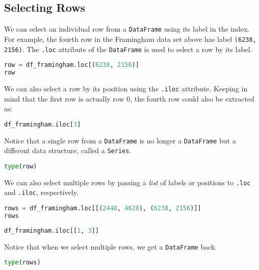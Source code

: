 \subsection{Selecting Rows}\label{1.2.1}

We can select an individual row from a \verb|DataFrame| using its label in the index. For example, the fourth row in the Framingham data set above has label \verb|(6238, 2156)|. The \verb|.loc| attribute of the \verb|DataFrame| is used to select a row by its label.

\begin{lstlisting}[language=Python]
row = df_framingham.loc[(6238, 2156)]
row
\end{lstlisting}




We can also select a row by its position using the \verb|.iloc| attribute. Keeping in mind that the first row is actually row 0, the fourth row could also be extracted as:

\begin{lstlisting}[language=Python]
df_framingham.iloc[3]
\end{lstlisting}




Notice that a single row from a \verb|DataFrame| is no longer a \verb|DataFrame| but a different data structure, called a \verb|Series|.

\begin{lstlisting}[language=Python]
type(row)
\end{lstlisting}




We can also select multiple rows by passing a \textit{list} of labels or positions to \verb|.loc| and \verb|.iloc|, respectively.

\begin{lstlisting}[language=Python]
rows = df_framingham.loc[[(2448, 4628), (6238, 2156)]]
rows
\end{lstlisting}


\begin{lstlisting}[language=Python]
df_framingham.iloc[[1, 3]]
\end{lstlisting}




Notice that when we select multiple rows, we get a \verb|DataFrame| back.

\begin{lstlisting}[language=Python]
type(rows)
\end{lstlisting}




